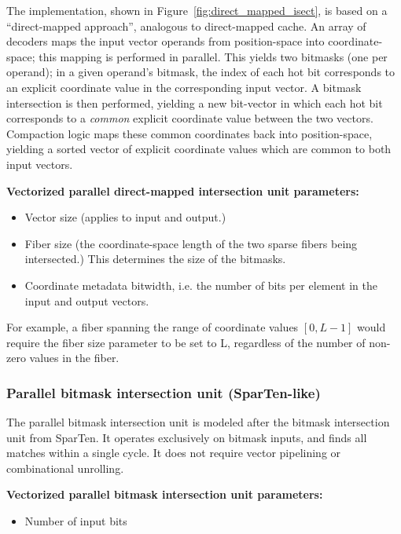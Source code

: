 The implementation, shown in Figure~\ref{fig:direct_mapped_isect}, is based on a ``direct-mapped approach'', analogous to direct-mapped cache. An array of decoders maps the input vector operands from position-space into coordinate-space; this mapping is performed in parallel. This yields two bitmasks (one per operand); in a given operand's bitmask, the index of each hot bit corresponds to an explicit coordinate value in the corresponding input vector. A bitmask intersection is then performed, yielding a new bit-vector in which each hot bit corresponds to a \textit{common} explicit coordinate value between the two vectors. Compaction logic maps these common coordinates back into position-space, yielding a sorted vector of explicit coordinate values which are common to both input vectors.

\textbf{Vectorized parallel direct-mapped intersection unit parameters:}

\begin{itemize}
    \item Vector size (applies to input and output.)
    \item Fiber size (the coordinate-space length of the two sparse fibers being intersected.) This determines the size of the bitmasks.
    \item Coordinate metadata bitwidth, i.e. the number of bits per element in the input and output vectors.
\end{itemize}

For example, a fiber spanning the range of coordinate values $[0,L-1]$ would require the fiber size parameter to be set to L, regardless of the number of non-zero values in the fiber.



\subsubsection{Parallel bitmask intersection unit (SparTen\cite{sparten}-like)}

The parallel bitmask intersection unit is modeled after the bitmask intersection unit from SparTen\cite{sparten}. It operates exclusively on bitmask inputs, and finds all matches within a single cycle. It does not require vector pipelining or combinational unrolling.

\textbf{Vectorized parallel bitmask intersection unit parameters:}

\begin{itemize}
    \item Number of input bits
\end{itemize}

